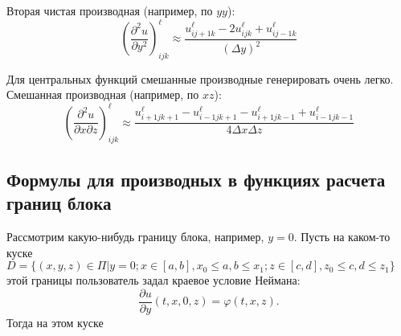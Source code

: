 \documentclass[a4paper]{article}
\begin{document}
Вторая чистая производная (например, по $yy$):
\begin{equation*}
\left(\frac{\partial^2 u}{\partial y^2}\right)^{\ell}_{ijk} \approx \frac{u^{\ell}_{ij+1k} - 2u^{\ell}_{ijk} + u^{\ell}_{ij-1k}}{(\Delta y)^2}
\end{equation*}

Для центральных функций смешанные производные генерировать очень легко. Смешанная производная (например, по $xz$):
\begin{equation*}
\left(\frac{\partial^2 u}{\partial x\partial z}\right)^{\ell}_{ijk} \approx \frac{u^{\ell}_{i+1jk+1} - u^{\ell}_{i-1jk+1} - u^{\ell}_{i+1jk-1} + u^{\ell}_{i-1jk-1}}{4\Delta x\Delta z}
\end{equation*}

\subsection{\Large Формулы для производных в функциях расчета границ блока}
Рассмотрим какую-нибудь границу блока, например, $y = 0$. Пусть на каком-то куске $D = \{(x,y,z) \in \Pi| y = 0; x \in [a,b], x_0 \leqslant a,b \leqslant x_1; z \in [c,d], z_0 \leqslant c,d \leqslant z_1\}$ этой границы пользователь задал краевое условие Неймана:
\begin{equation}\label{e3}
\frac{\partial u}{\partial y}(t,x,0,z) = \varphi(t,x,z).
\end{equation}
Тогда на этом куске
\end{document}
